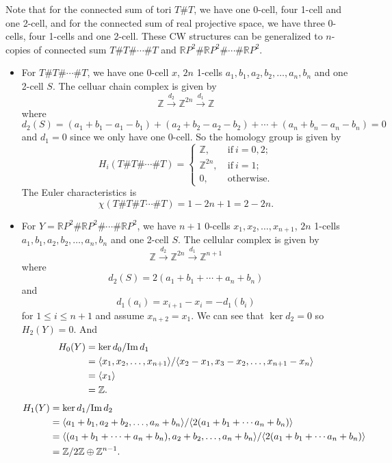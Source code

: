 \documentclass[a4paper, 12pt]{article}
\begin{document}
\begin{solution}
\begin{enumerate}[(1)]
Note that for the connected sum of tori \(T\#T\), we have one 0-cell, four 1-cell and one 2-cell, and for the connected sum of real projective space, we have three 0-cells, four 1-cells and one 2-cell. These CW structures can be generalized to \(n\)-copies of 
connected sum \(T\#T\#\cdots \#T\) and \(\mathbb{R}P^2\#\mathbb{R}P^2\#\cdots\#\mathbb{R}P^2\). 
\begin{itemize}
\item For \(T\#T\#\cdots\#T\), we have one 0-cell \(x\), \(2n\) 1-cells \(a_1,b_1,a_2,b_2,\ldots,a_n,b_n\) and one 2-cell \(S\). The celluar chain complex is given by 
\[\mathbb{Z}\xrightarrow{d_2}\mathbb{Z}^{2n}\xrightarrow{d_1} \mathbb{Z}\]
where 
\[d_2(S)=(a_1+b_1-a_1-b_1)+(a_2+b_2-a_2-b_2)+\cdots+(a_n+b_n-a_n-b_n)=0\]
and \(d_1=0\) since we only have one 0-cell. So the homology group is given by 
\[H_i(T\#T\#\cdots\#T)=\begin{cases}
    \mathbb{Z},&\ \text{if}\ i=0,2;\\
    \mathbb{Z}^{2n},&\ \text{if}\ i=1;\\ 
    0,&\ \text{otherwise}. 
\end{cases}\]
The Euler characteristics is 
\[\chi(T\#T\#T\cdots\# T)=1-2n+1=2-2n.\]
\item For \(Y=\mathbb{R}P^2\#\mathbb{R}P^2\#\cdots\#\mathbb{R}P^2\), we have \(n+1\) 0-cells \(x_1,x_2,\ldots,x_{n+1}\), \(2n\) 1-cells \(a_1,b_1,a_2,b_2,\ldots,a_n,b_n\) and one 2-cell \(S\). The cellular complex is given by 
\[\mathbb{Z}\xrightarrow{d_2}\mathbb{Z}^{2n}\xrightarrow{d_1}\mathbb{Z}^{n+1}\]
where 
\[d_2(S)=2(a_1+b_1+\cdots+a_n+b_n)\]
and 
\[d_1(a_i)=x_{i+1}-x_i=-d_1(b_i)\]
for \(1\leq i\leq n+1\) and assume \(x_{n+2}=x_1\). We can see that \(\ker d_2=0\) so \(H_2(Y)=0\). And 
\begin{align*}
    H_0(Y)&=\ker d_0/\text{Im}\, d_1\\ 
          &=\langle x_1,x_2,\ldots,x_{n+1}\rangle/\langle x_2-x_1,x_3-x_2,\ldots,x_{n+1}-x_n\rangle\\ 
          &=\langle x_1\rangle\\ 
          &=\mathbb{Z}. 
\end{align*}
\begin{align*}
    H_1(Y)&=\ker d_1/\im d_2\\ 
          &=\la a_1+b_1,a_2+b_2,\ldots,a_n+b_n\ra/\la 2(a_1+b_1+\cdots a_n+b_n)\ra\\ 
          &=\la (a_1+b_1+\cdots+a_n+b_n),a_2+b_2,\ldots,a_n+b_n\ra/\la 2(a_1+b_1+\cdots a_n+b_n)\ra\\ 
          &=\mathbb{Z}/2 \mathbb{Z}\oplus \mathbb{Z}^{n-1}.

\end{align*}
\end{itemize}
\end{enumerate}
\end{solution}
\end{document}
